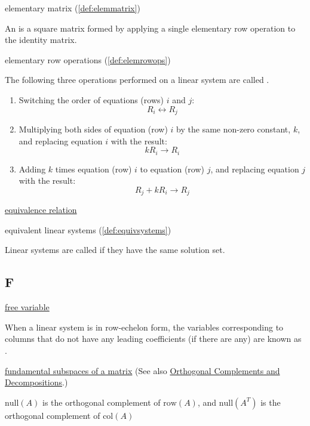 \documentclass{ximera}
\begin{document}
elementary matrix (\ref{def:elemmatrix})
\begin{expandable}{}{}
    An  is a square matrix formed by applying a single elementary row operation to the identity matrix.
\end{expandable}

elementary row operations (\ref{def:elemrowops})
\begin{expandable}{}{}
    The following three operations performed on a linear system are called .
\begin{enumerate}
\item Switching the order of equations (rows) $i$ and $j$:
$$R_i\leftrightarrow R_j$$
\item Multiplying both sides of equation (row) $i$ by the same non-zero constant, $k$, and replacing equation $i$ with the result:
$$kR_i\rightarrow R_i$$
\item Adding $k$ times equation (row) $i$ to equation (row) $j$, and replacing equation $j$ with the result:
$$R_j+kR_i\rightarrow R_j$$
\end{enumerate}
\end{expandable}

\href{https://ximera.osu.edu/linearalgebradzv3/LinearAlgebraInteractiveIntro/EIG-0040/main}{equivalence relation}

equivalent linear systems (\ref{def:equivsystems})
\begin{expandable}{}{}
    Linear systems are called  if they have the same solution set.
\end{expandable}



\subsection*{F}

\href{https://ximera.osu.edu/linearalgebradzv3/LinearAlgebraInteractiveIntro/SYS-0020/main}{free variable}
\begin{expandable}{}{}
    When a linear system is in row-echelon form, the variables corresponding to columns that do not have any leading coefficients (if there are any) are known as .
\end{expandable}

\href{https://ximera.osu.edu/linearalgebradzv3/LinearAlgebraInteractiveIntro/VSP-0040/main}{fundamental subspaces of a matrix}
(See also \href{https://ximera.osu.edu/linearalgebradzv3/LinearAlgebraInteractiveIntro/RTH-0020/main}{Orthogonal Complements and Decompositions}.)
\begin{expandable}{}{}
    $\mbox{null}(A)$ is the orthogonal complement of $\mbox{row}(A)$, and $\mbox{null}(A^T)$ is the orthogonal complement of $\mbox{col}(A)$
\end{expandable}
\end{document}

